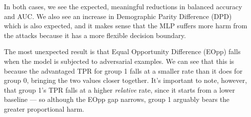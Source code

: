 \documentclass[11pt]{article}
\begin{document}
In both cases, we see the expected, meaningful reductions in balanced accuracy and AUC. We also see an increase in Demographic Parity Difference (DPD) which is also expected, and it makes sense that the MLP suffers more harm from the attacks because it has a more flexible decision boundary.

The most unexpected result is that Equal Opportunity Difference (EOpp)  falls when the model is subjected to adversarial examples. We can see that this is because the advantaged TPR for group 1 falls at a smaller rate than it does for group 0, bringing the two values closer together. It's important to note, however, that group 1's TPR falls at a higher \textit{relative} rate, since it starts from a lower baseline — so although the EOpp gap narrows, group 1 arguably bears the greater proportional harm.
\end{document}
